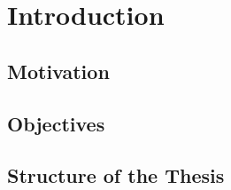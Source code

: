 \chapter{Introduction}

\section{Motivation}


\section{Objectives}


\section{Structure of the Thesis}

